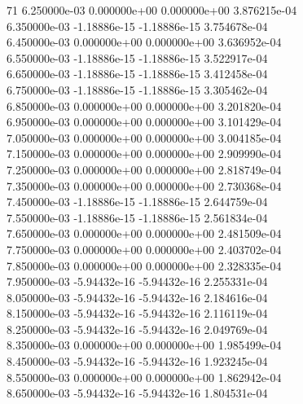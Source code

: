 71	6.250000e-03	0.000000e+00	0.000000e+00	3.876215e-04	\\ 	6.350000e-03	-1.18886e-15	-1.18886e-15	3.754678e-04	\\ 	6.450000e-03	0.000000e+00	0.000000e+00	3.636952e-04	\\ 	6.550000e-03	-1.18886e-15	-1.18886e-15	3.522917e-04	\\ 	6.650000e-03	-1.18886e-15	-1.18886e-15	3.412458e-04	\\ 	6.750000e-03	-1.18886e-15	-1.18886e-15	3.305462e-04	\\ 	6.850000e-03	0.000000e+00	0.000000e+00	3.201820e-04	\\ 	6.950000e-03	0.000000e+00	0.000000e+00	3.101429e-04	\\ 	7.050000e-03	0.000000e+00	0.000000e+00	3.004185e-04	\\ 	7.150000e-03	0.000000e+00	0.000000e+00	2.909990e-04	\\ 	7.250000e-03	0.000000e+00	0.000000e+00	2.818749e-04	\\ 	7.350000e-03	0.000000e+00	0.000000e+00	2.730368e-04	\\ 	7.450000e-03	-1.18886e-15	-1.18886e-15	2.644759e-04	\\ 	7.550000e-03	-1.18886e-15	-1.18886e-15	2.561834e-04	\\ 	7.650000e-03	0.000000e+00	0.000000e+00	2.481509e-04	\\ 	7.750000e-03	0.000000e+00	0.000000e+00	2.403702e-04	\\ 	7.850000e-03	0.000000e+00	0.000000e+00	2.328335e-04	\\ 	7.950000e-03	-5.94432e-16	-5.94432e-16	2.255331e-04	\\ 	8.050000e-03	-5.94432e-16	-5.94432e-16	2.184616e-04	\\ 	8.150000e-03	-5.94432e-16	-5.94432e-16	2.116119e-04	\\ 	8.250000e-03	-5.94432e-16	-5.94432e-16	2.049769e-04	\\ 	8.350000e-03	0.000000e+00	0.000000e+00	1.985499e-04	\\ 	8.450000e-03	-5.94432e-16	-5.94432e-16	1.923245e-04	\\ 	8.550000e-03	0.000000e+00	0.000000e+00	1.862942e-04	\\ 	8.650000e-03	-5.94432e-16	-5.94432e-16	1.804531e-04	\\ \hline
